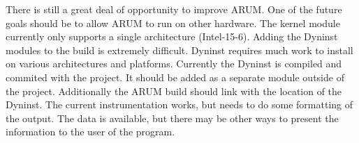 \documentclass[11pt,letterpaper,oneside]{article}
\begin{document}
There is still a great deal of opportunity to improve ARUM.   One of the future goals should be to allow ARUM to run on other hardware.  The kernel module currently only supports a single architecture (Intel-15-6).  Adding the Dyninst modules to the build is extremely difficult.  Dyninst requires much work to install on various architectures and platforms.   Currently the Dyninst is compiled and commited with the project.  It should be added as a separate module outside of the project.  Additionally the ARUM build should link with the location of the Dyninst.
\newline
The current instrumentation works, but needs to do some formatting of the output.  The data is available, but there may be other ways to present the information to the user of the program.
\newline




\end{document}
